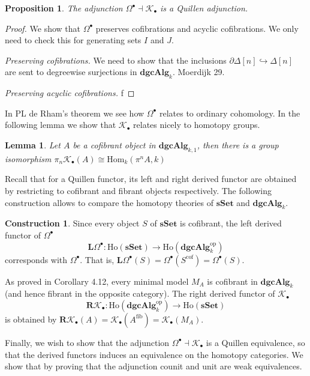 \documentclass[psamsfonts]{amsart}
\newtheorem{prop}{Proposition}[section]
\newtheorem{lem}{Lemma}[section]
\theoremstyle{definition}
\newtheorem{con}{Construction}[section]
\newcommand{\sSet}{\mathbf{sSet}}
\newcommand{\dgcAlg}{\mathbf{dgcAlg}}
\newcommand{\Hom}{\mathrm{Hom}}
\newcommand{\Ho}{\mathrm{Ho}}
\numberwithin{equation}{section}
\begin{document}
\begin{prop}
The adjunction $\Omega^\bullet\dashv\mathcal{K}_\bullet$ is a Quillen adjunction.
\end{prop}
\begin{proof}
We show that $\Omega^\bullet$ preserves cofibrations and acyclic cofibrations. We only need to check this for generating sets $I$ and $J$.\medbreak

\textit{Preserving cofibrations.} We need to show that the inclusions $\partial\Delta[n]\hookrightarrow\Delta[n]$ are sent to degreewise surjections in $\dgcAlg_k$. Moerdijk 29.\medbreak

\textit{Preserving acyclic cofibrations.} f
\end{proof}

In PL de Rham's theorem we see how $\Omega^\bullet$ relates to ordinary cohomology. In the following lemma we show that $\mathcal{K}_\bullet$ relates nicely to homotopy groups.

\begin{lem}
Let $A$ be a cofibrant object in $\dgcAlg_{k,1}$, then there is a group isomorphism $\pi_n\mathcal{K}_\bullet(A)\cong\Hom_k(\pi^nA,k)$
\end{lem}

Recall that for a Quillen functor, its left and right derived functor are obtained by restricting to cofibrant and fibrant objects respectively. The following construction allows to compare the homotopy theories of $\sSet$ and $\dgcAlg_k$.

\begin{con}
Since every object $S$ of $\sSet$ is cofibrant, the left derived functor of $\Omega^\bullet$
\[\mathbf{L}\Omega^\bullet:\Ho(\sSet)\to\Ho(\dgcAlg_k^\textrm{op})\]
corresponds with $\Omega^\bullet$. That is, $\mathbf{L}\Omega^\bullet(S)=\Omega^\bullet(S^\textrm{cof})=\Omega^\bullet(S)$.

As proved in Corollary 4.12, every minimal model $M_A$ is cofibrant in $\dgcAlg_k$ (and hence fibrant in the opposite category). The right derived functor of $\mathcal{K}_\bullet$
\[\mathbf{R}\mathcal{K}_\bullet:\Ho(\dgcAlg_k^\textrm{op})\to\Ho(\sSet)\]
is obtained by $\mathbf{R}\mathcal{K}_\bullet(A)=\mathcal{K}_\bullet(A^\textrm{fib})=\mathcal{K}_\bullet(M_A)$.
\end{con}

Finally, we wish to show that the adjunction $\Omega^\bullet\dashv\mathcal{K}_\bullet$ is a Quillen equivalence, so that the derived functors induces an equivalence on the homotopy categories. We show that by proving that the adjunction counit and unit are weak equivalences.
\end{document}
